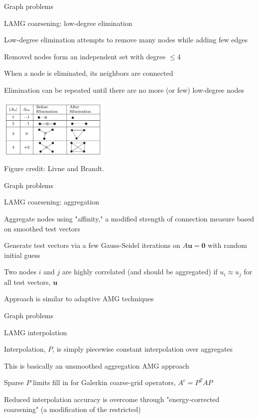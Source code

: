 \documentclass[18pt,xcolor=table]{beamer}
\begin{document}
\begin{frame}{Graph problems}
\begin{block}{LAMG coarsening: low-degree elimination}
\bit
\item Low-degree elimination attempts to remove many nodes while adding few edges
\item Removed nodes form an independent set with degree $\leq 4$
\item When a node is eliminated, its neighbors are connected
\item Elimination can be repeated until there are no more (or few) low-degree nodes
\eit
\end{block}
\begin{center}
\includegraphics[width=0.4\textwidth]{../figures/lowDegreeElim}
\end{center}
\tiny{Figure credit: Livne and Brandt.}
\end{frame}

\begin{frame}{Graph problems}
\begin{block}{LAMG coarsening: aggregation}
\bit
\item Aggregate nodes using "affinity," a modified strength of connection measure based on smoothed test vectors
\item Generate test vectors via a few Gauss-Seidel iterations on $A\mathbf{u} = \mathbf{0}$ with random initial guess
\item Two nodes $i$ and $j$ are highly correlated (and should be aggregated) if $u_i\approx u_j$ for all test vectors, $\mathbf{u}$
\item Approach is similar to adaptive AMG techniques
\eit
\end{block}
\end{frame}

\begin{frame}{Graph problems}
\begin{block}{LAMG interpolation}
\bit
\item Interpolation, $P$, is simply piecewise constant interpolation over aggregates
\item This is basically an unsmoothed aggregation AMG approach
\item Sparse $P$ limits fill in for Galerkin coarse-grid operators, $A^c = P^TAP$
\item Reduced interpolation accuracy is overcome through "energy-corrected coarsening" (a modification of the restricted)
\eit
\end{block}
\end{frame}
\end{document}
